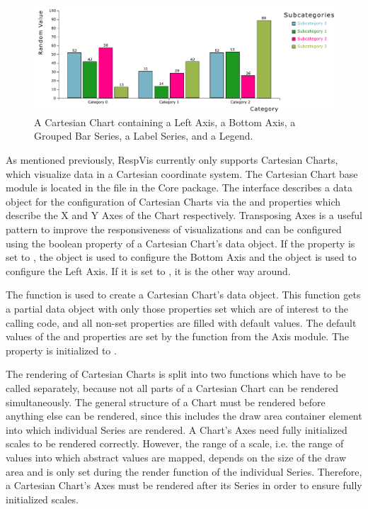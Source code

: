 \begin{figure}[tp]
\centering
\includegraphics[keepaspectratio,width=\linewidth,height=\fullh]
{diagrams/chart.pdf}
\caption[Cartesian Chart Example]{%
A Cartesian Chart containing a Left Axis, a Bottom Axis,
a Grouped Bar Series, a Label Series, and a Legend.
}
\label{fig:Chart}
\end{figure}


As mentioned previously, RespVis currently only supports Cartesian
Charts, which visualize data in a Cartesian coordinate system. The
Cartesian Chart base module is
located in the  file in the Core package. The
 interface describes a data object for the
configuration of Cartesian Charts via the  and
  properties which describe the X and Y Axes of
the Chart respectively. Transposing Axes is a useful pattern to
improve the responsiveness of visualizations and can be configured
using the  boolean property of a Cartesian Chart's
data object. If the  property is set to ,
the  object is used to configure the Bottom Axis and the
 object is used to configure the Left Axis. If it is set
to , it is the other way around.

The  function is used to create a
Cartesian Chart's data object. This function gets a partial data
object with only those properties set which are of interest to the
calling code, and all non-set properties are filled with default
values. The default values of the  and 
properties are set by the  function from the Axis
module. The  property is initialized to .

The rendering of Cartesian Charts is split into two functions which
have to be called separately, because not all parts of a Cartesian
Chart can be rendered simultaneously. The general structure of a Chart
must be rendered before anything else can be rendered, since this
includes the draw area container element into which individual Series
are rendered. A Chart's Axes need fully initialized scales to be
rendered correctly. However, the range of a scale, i.e. the range of
values into which abstract values are mapped, depends on the size of
the draw area and is only set during the render function of the
individual Series. Therefore, a Cartesian Chart's Axes must be
rendered after its Series in order to ensure fully initialized scales.

